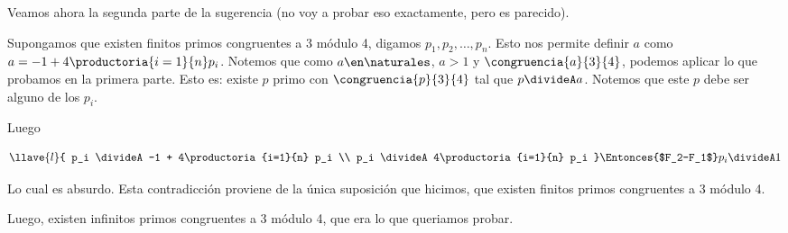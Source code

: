 Veamos ahora la segunda parte de la sugerencia (no voy a probar eso exactamente, pero es parecido). \par
Supongamos que existen finitos primos congruentes a 3 módulo 4, digamos $p_1, p_2, \dots, p_n$. 
Esto nos permite definir $a$ como $a = -1 + 4\productoria{i=1}{n} p_i$.
Notemos que como $a \en \naturales$, $a > 1$ y $\congruencia{a}{3}{4}$, podemos aplicar lo que probamos en la primera parte.
Esto es: existe $p$ primo con $\congruencia{p}{3}{4}$ tal que $p \divideA a$. Notemos que este $p$ debe ser alguno de los $p_i$. \par
Luego

$$
\llave{l}{
    p_i \divideA -1 + 4\productoria{i=1}{n} p_i \\
    p_i \divideA 4\productoria{i=1}{n} p_i
}
\Entonces{$F_2-F_1$}
p_i \divideA 1
$$

Lo cual es absurdo. Esta contradicción proviene de la única suposición que hicimos, que existen finitos primos congruentes a 3 módulo 4. \par
Luego, existen infinitos primos congruentes a 3 módulo 4, que era lo que queriamos probar.

\begin{aportes}
        \item {}
\end{aportes}